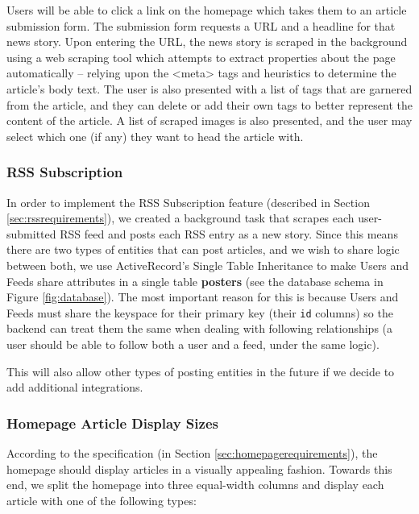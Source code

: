 \documentclass[11pt,letterpaper]{article}
\begin{document}
Users will be able to click a link on the homepage which takes them to an article submission form.
The submission form requests a URL and a headline for that news story.
Upon entering the URL, the news story is scraped in the background using a web scraping tool which attempts to extract properties about the page automatically -- relying upon the <meta> tags and heuristics to determine the article's body text. The user is also presented with a list of tags that are garnered from the article, and they can delete or add their own tags to better represent the content of the article. A list of scraped images is also presented, and the user may select which one (if any) they want to head the article with.

\subsubsection{RSS Subscription}
\label{sec:frontendrss}
In order to implement the RSS Subscription feature (described in Section \ref{sec:rssrequirements}), we created a background task that scrapes each user-submitted RSS feed and posts each RSS entry as a new story.
Since this means there are two types of entities that can post articles, and we wish to share logic between both, we use ActiveRecord's Single Table Inheritance\cite{sti} to make Users and Feeds share attributes in a single table \textbf{posters} (see the database schema in Figure \ref{fig:database}).
The most important reason for this is because Users and Feeds must share the keyspace for their primary key (their \verb+id+ columns) so the backend can treat them the same when dealing with following relationships (a user should be able to follow both a user and a feed, under the same logic).

This will also allow other types of posting entities in the future if we decide to add additional integrations.

\subsubsection{Homepage Article Display Sizes}
According to the specification (in Section \ref{sec:homepagerequirements}), the homepage should display articles in a visually appealing fashion.
Towards this end, we split the homepage into three equal-width columns and display each article with one of the following types:
\end{document}
